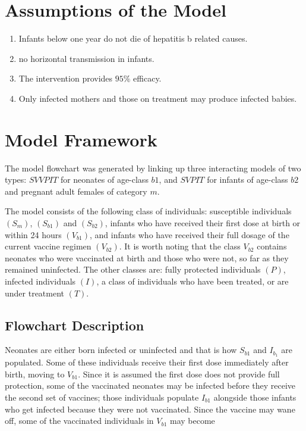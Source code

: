 \documentclass[11pt,a4paper]{article}
\begin{document}
	
	\section{Assumptions of the Model}
	\begin{enumerate}
	\item Infants below one year do not die of hepatitis b related causes.
	\item no horizontal transmission in infants.
	\item The intervention provides $95\%$ efficacy.
	\item Only infected mothers and those on treatment may produce infected babies. 
	\end{enumerate}
		
	\section{Model Framework}
		The model flowchart was generated by linking up three interacting models of two types: $SVVPIT$ for neonates of age-class $b1$, and $SVPIT$ for infants of age-class $b2$ and pregnant adult females of category $m$.
		
		The model consists of the following class of individuals: susceptible individuals $(S_m)$, $(S_{b1})$ and $(S_{b2})$, infants who have received their first dose at birth or within 24 hours $(V_{b1})$, and infants who have received their full dosage of the current vaccine regimen $(V_{b2})$. It is worth noting that the class $V_{b2}$ contains neonates who were vaccinated at birth and those who were not, so far as they remained uninfected. The other classes are: fully protected individuals $(P)$, infected individuals $(I)$, a class of individuals who have been treated, or are under treatment $(T)$.
		
		\subsection{Flowchart Description}
		Neonates are either born infected or uninfected and that is how $S_{b1}$ and $I_{b_1}$ are populated. Some of these individuals receive their first dose immediately after birth, moving to $V_{b1}$. Since it is assumed the first dose does not provide full protection, some of the vaccinated neonates may be infected before they receive the second set of vaccines; those individuals populate $I_{b1}$ alongside those infants who get infected because they were not vaccinated. Since the vaccine may wane off, some of the vaccinated individuals in $V_{b1}$ may become 
		
\end{document}
